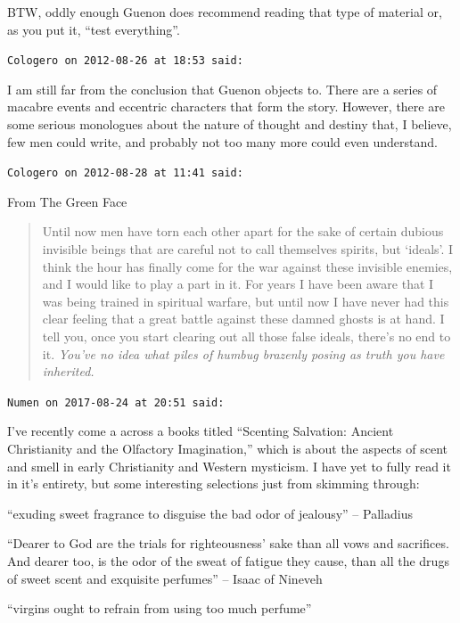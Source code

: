 \begin{footnotesize}
\begin{sffamily}
BTW, oddly enough Guenon does recommend reading that type of material or, as you put it, ``test everything''.

\hfill

\texttt{Cologero on 2012-08-26 at 18:53 said:}

I am still far from the conclusion that Guenon objects to. There are a series of macabre events and eccentric characters that form the story. However, there are some serious monologues about the nature of thought and destiny that, I believe, few men could write, and probably not too many more could even understand.

\hfill

\texttt{Cologero on 2012-08-28 at 11:41 said:}

From The Green Face

\begin{quote}\footnotesize

Until now men have torn each other apart for the sake of certain dubious invisible beings that are careful not to call themselves spirits, but `ideals'. I think the hour has finally come for the war against these invisible enemies, and I would like to play a part in it. For years I have been aware that I was being trained in spiritual warfare, but until now I have never had this clear feeling that a great battle against these damned ghosts is at hand. I tell you, once you start clearing out all those false ideals, there's no end to it. \emph{You've no idea what piles of humbug brazenly posing as truth you have inherited.}
\end{quote}


\hfill

\texttt{Numen on 2017-08-24 at 20:51 said:}

I've recently come a across a books titled ``Scenting Salvation: Ancient Christianity and the Olfactory Imagination,'' which is about the aspects of scent and smell in early Christianity and Western mysticism. I have yet to fully read it in it's entirety, but some interesting selections just from skimming through:

``exuding sweet fragrance to disguise the bad odor of jealousy'' -- Palladius

``Dearer to God are the trials for righteousness' sake than all vows and sacrifices. And dearer too, is the odor of the sweat of fatigue they cause, than all the drugs of sweet scent and exquisite perfumes'' -- Isaac of Nineveh

``virgins ought to refrain from using too much perfume''


\hfill

\end{sffamily}
\end{footnotesize}

